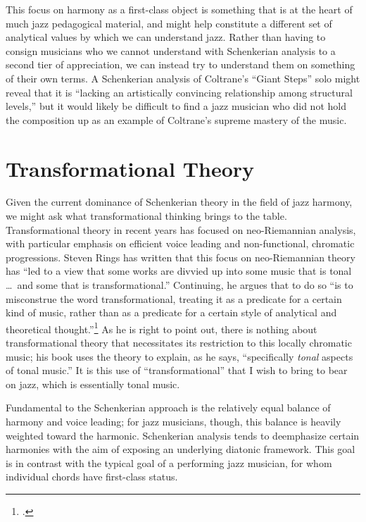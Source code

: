\documentclass[diss]{subfiles}
\begin{document}
This focus on harmony as a first-class object is something that is at the
heart of much jazz pedagogical material, and might help constitute a different
set of analytical values by which we can understand jazz. Rather than having
to consign musicians who we cannot understand with Schenkerian analysis to a
second tier of appreciation, we can instead try to understand them on
something of their own terms. A Schenkerian analysis of Coltrane’s “Giant
Steps” solo might reveal that it is “lacking an artistically convincing
relationship among structural levels,” but it would likely be difficult to
find a jazz musician who did not hold the composition up as an example of Coltrane’s
supreme mastery of the music.


\section{Transformational Theory}
\label{sec:transformational-theory} %

Given the current dominance of Schenkerian theory in the field of jazz
harmony, we might ask what transformational thinking brings to the table.
Transformational theory in recent years has focused on neo-Riemannian
analysis, with particular emphasis on efficient voice leading and
non-functional, chromatic progressions. Steven Rings has written that this
focus on neo-Riemannian theory has “led to a view that some works are divvied
up into some music that is tonal \ldots\ and some that is transformational.”
Continuing, he argues that to do so “is to misconstrue the word
transformational, treating it as a predicate for a certain kind of music,
rather than as a predicate for a certain style of analytical and theoretical
thought.”\footcite[9]{rings:2011} As he is right to point out, there is
nothing about transformational theory that necessitates its restriction to
this locally chromatic music; his book uses the theory to explain, as he says,
“specifically \emph{tonal} aspects of tonal music.” It is this use of
“transformational” that I wish to bring to bear on jazz, which is essentially
tonal music.

Fundamental to the Schenkerian approach is the relatively equal balance of
harmony and voice leading; for jazz musicians, though, this balance is heavily
weighted toward the harmonic.  Schenkerian analysis tends to deemphasize
certain harmonies with the aim of exposing an underlying diatonic framework.
This goal is in contrast with the typical goal of a performing jazz musician,
for whom individual chords have first-class status.
\end{document}
